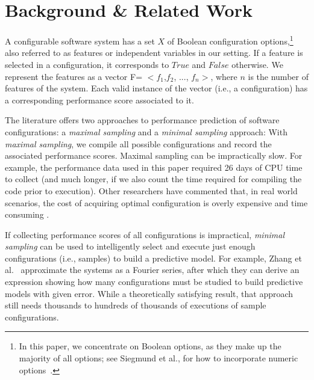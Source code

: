 \documentclass{sig-alternative}
\begin{document}


\section{Background \& Related Work}  
\label{sect:addit}

A configurable software system has a set $X$ of Boolean configuration options,\footnote{In this paper, we concentrate on Boolean options, as they make up the majority of all options; see Siegmund et al., for how to incorporate numeric options~\cite{SGA+15}.} also referred to as features or independent variables in our setting. 
If a feature is selected in a configuration, it corresponds to $\mathit{True}$ and $\mathit{False}$ otherwise. We represent the features as a vector F=  $<f_1$,$f_2$, ..., $f_n>$, where $n$ is the number of features of the system. Each valid instance of the vector (i.e., a configuration) has a corresponding performance score associated to it. 

The literature offers two approaches to performance prediction of software configurations: a {\em maximal sampling} and a {\em minimal sampling} approach: 
With {\em maximal sampling}, we compile all  possible configurations and record the associated performance scores. 
Maximal sampling  can be impractically slow. For example, the performance data used in this paper required  26 days of CPU time to collect (and much longer, if we also count the time required for compiling the code prior to execution). 
 Other researchers have commented that,  in 
 real world scenarios, the cost of acquiring optimal configuration is overly expensive and time consuming \cite{weiss2008maximizing}.
 
 If collecting performance scores of all configurations is impractical,  {\em minimal sampling} 
 can be used to intelligently select and execute just enough configurations (i.e., samples) to build a
 predictive model.
 For example, Zhang et al.~\cite{zhang2015performance} approximate the
 systems as a Fourier series, after which they can derive an expression showing how many configurations must be studied
 to build predictive models with given error. While a theoretically satisfying result, that approach still needs thousands to hundreds of thousands of executions of sample
 configurations.  
\end{document}
